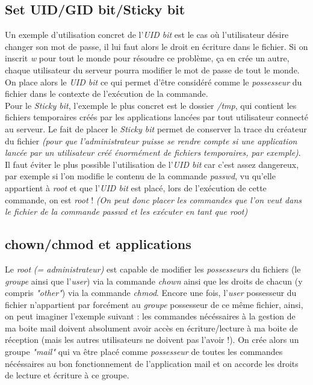 \documentclass{article}
\newcommand{\titre}[1]{\textcolor{title}{#1}}
\newcommand{\term}[1]{\textit{\textcolor{maintitle}{#1}}}
\begin{document}
\begin{sffamily}
\newpage

\titre{\subsection{Set UID/GID bit/Sticky bit}}

Un exemple d'utilisation concret de l'\term{UID bit} est le cas où l'utilisateur désire changer son mot de passe, il 
lui faut alors le droit en écriture dans le fichier. Si on inscrit \term{w} pour tout le monde pour résoudre ce 
problème, ça en crée un autre, chaque utilisateur du serveur pourra modifier le mot de passe de tout le monde. On place 
alors le \term{UID bit} ce qui permet d'être considéré comme le \term{possesseur} du fichier dans le contexte de 
l'exécution de la commande. \\

Pour le \term{Sticky bit}, l'exemple le plus concret est le dossier \textit{/tmp}, qui contient les fichiers 
temporaires créés par les applications lancées par tout utilisateur connecté au serveur. Le fait de placer le 
\term{Sticky bit} permet de conserver la trace du créateur du fichier \textit{(pour que l'administrateur puisse se 
rendre compte si une application lancée par un utilisateur créé énormément de fichiers temporaires, par exemple)}. \\

Il faut éviter le plus possible l'utilisation de l'\term{UID bit} car c'est assez dangereux, par exemple si l'on 
modifie le contenu de la commande \textit{passwd}, vu qu'elle appartient à \term{root} et que l'\term{UID bit} est 
placé, lors de l'exécution de cette commande, on est \term{root} ! \textit{(On peut donc placer les commandes que l'on 
veut dans le fichier de la commande \textit{passwd} et les exécuter en tant que \term{root})}

\titre{\subsection{chown/chmod et applications}}

Le \term{root} \textit{(= administrateur)} est capable de modifier les \term{possesseurs} du fichiers (le \term{groupe} 
ainsi que l'\term{user}) via la commande \textit{chown} ainsi que les droits de chacun (y compris 
\textit{"\term{other}"}) via la commande \textit{chmod}. Encore une fois, l'\term{user} possesseur du fichier 
n'appartient par forcément au \term{groupe} possesseur de ce même fichier, ainsi, on peut imaginer l'exemple suivant : 
les commandes nécéssaires à la gestion de ma boite mail doivent absolument avoir accès en écriture/lecture à ma boite 
de réception (mais les autres utilisateurs ne doivent pas l'avoir !). On crée alors un groupe \textit{"mail"} qui va 
être placé comme \term{possesseur} de toutes les commandes nécéssaires au bon fonctionnement de l'application mail et 
on accorde les droits de lecture et écriture à ce groupe.


\end{sffamily}
\end{document}
